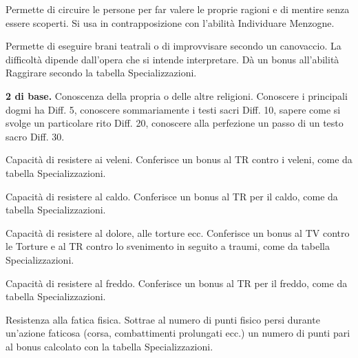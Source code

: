 \fi

  Permette di circuire le
persone per far valere le proprie ragioni e di mentire senza essere
scoperti. Si usa in contrapposizione con l'abilit\`a Individuare
Menzogne.

\iffullversion
{}  Permette di eseguire brani
teatrali o di improvvisare secondo un canovaccio.  La difficolt\`a
dipende dall'opera che si intende interpretare. D\`a un bonus
all'abilit\`a Raggirare secondo la tabella Specializzazioni.

 \textbf{2 di base.} Conoscenza della propria o
delle altre religioni. Conoscere i principali dogmi ha Diff. 5,
conoscere sommariamente i testi sacri Diff. 10, sapere come si svolge
un particolare rito Diff. 20, conoscere alla perfezione un passo di un
testo sacro Diff. 30.
\fi

Capacit\`a di resistere ai veleni. Conferisce un bonus al TR contro
i veleni, come da tabella Specializzazioni.

Capacit\`a di resistere al caldo. Conferisce un
bonus al TR per il caldo, come da tabella Specializzazioni.

 Capacit\`a di resistere al dolore,
alle torture ecc.  Conferisce un bonus al TV contro le Torture e al TR
contro lo svenimento in seguito a traumi, come da tabella
Specializzazioni.

 Capacit\`a di resistere al
freddo. Conferisce un bonus al TR per il freddo, come da tabella
Specializzazioni.

Resistenza alla fatica fisica. Sottrae al numero di punti fisico persi
durante un'azione faticosa (corsa, combattimenti prolungati ecc.)
un numero di punti pari al bonus calcolato con la tabella
Specializzazioni.  

